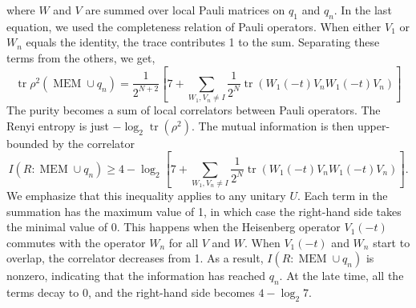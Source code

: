 \documentclass[aps,prb,superscriptaddress,nofootinbib]{revtex4}
\def \tr{\operatorname{tr}}
\begin{document}
where $W$ and $V$ are summed over local Pauli matrices on $q_1$ and $q_n$.
In the last equation, we used the completeness relation of Pauli operators.
When either $V_1$ or $W_n$ equals the identity, the trace contributes 1 to the sum. 
Separating these terms from the others, we get,
\begin{equation}
	\tr \rho^2\left(\operatorname{MEM} \cup q_n\right)
	= \frac{1}{2^{N+2}}\left[7+\sum_{W_1 ,V_n \neq I} \frac{1}{2^N} \tr\left(W_1(-t) V_n W_1(-t) V_n\right)\right]
\end{equation}
The purity becomes a sum of local correlators between Pauli operators. 
The Renyi entropy is just $-\log_2 \tr\left(\rho^2\right)$. 
The mutual information is then upper-bounded by the correlator
\begin{equation}
	I\left(R: \operatorname{MEM} \cup q_n\right) 
	\ge 4-\log _2\left[7+\sum_{W_1, V_n \neq I} \frac{1}{2^N} \tr\left(W_1(-t) V_n W_1(-t) V_n\right)\right].
\end{equation}
We emphasize that this inequality applies to any unitary $U$. 
Each term in the summation has the maximum value of 1, in which case the right-hand side takes the minimal value of 0. 
This happens when the Heisenberg operator $V_1(-t)$ commutes with the operator $W_n$ for all $V$ and $W$. 
When $V_1(-t)$ and $W_n$ start to overlap, the correlator decreases from 1. 
As a result, $I\left(R:\operatorname{MEM} \cup q_n\right)$ is nonzero, indicating that the information has reached $q_n$. 
At the late time, all the terms decay to 0, and the right-hand side becomes $4-\log _2 7$.
\end{document}
